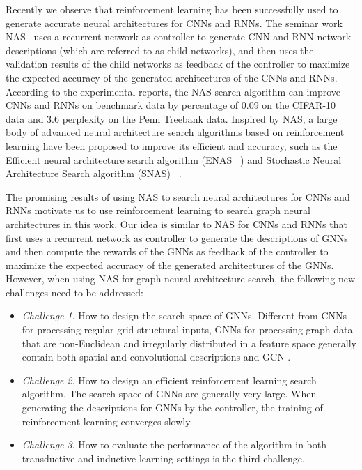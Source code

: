 \documentclass{article}
\begin{document}
Recently we observe that reinforcement learning has been successfully used to generate accurate neural architectures for CNNs and RNNs. The seminar work NAS~\cite{NAS} uses a recurrent network as controller to generate CNN and RNN network descriptions (which are referred to as child networks), and then uses the validation results of the child networks as feedback of the controller to maximize the expected accuracy of the generated architectures of the CNNs and RNNs. According to the experimental reports, the NAS search algorithm can improve CNNs and RNNs on benchmark data by percentage of 0.09 on the CIFAR-10 data and 3.6 perplexity on the Penn Treebank data. Inspired by NAS, a large body of advanced neural architecture search algorithms based on reinforcement learning have been proposed to improve its efficient and accuracy, such as the Efficient neural architecture search algorithm (ENAS ~\cite{ENAS}) and Stochastic Neural Architecture Search algorithm (SNAS) ~\cite{Xie2018SNASSN}. 

The promising results of using NAS to search neural architectures for CNNs and RNNs motivate us to use reinforcement learning to search graph neural architectures in this work. Our idea is similar to NAS for CNNs and RNNs that first uses a recurrent network as controller to generate the descriptions of GNNs and then compute the rewards of the GNNs as feedback of the controller to maximize the expected accuracy of the generated architectures of the GNNs. However, when using NAS for graph neural architecture search, the following new challenges need to be addressed:  

\begin{itemize}
	\item \textit{Challenge 1}. How to design the search space of GNNs.
Different from CNNs for processing regular grid-structural inputs, GNNs for processing graph data that are non-Euclidean and irregularly distributed in a feature space generally contain both spatial and convolutional descriptions \cite{GraphSAGE} and GCN \cite{kipf2017semi} . 
	\item \textit{Challenge 2}. How to design an efficient reinforcement learning search algorithm. The search space of GNNs are generally very large. When generating the descriptions for GNNs by the controller, the training of reinforcement learning converges slowly.  
	\item \textit{Challenge 3}. How to evaluate the performance of the algorithm in both transductive and inductive learning settings is the third challenge. 
\end{itemize}
\end{document}
